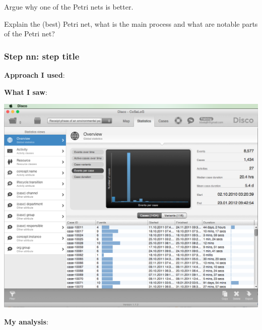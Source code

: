 \documentclass[]{article}
\begin{document}
Argue why one of the Petri nets is better.

Explain the (best) Petri net, what is the main process and what are
notable parts of the Petri net?

\subsubsection{Step nn: step title}\label{step-nn-step-title}

\textbf{Approach I used}:

\textbf{What I saw}:

\includegraphics{dummy.png}

\textbf{My analysis}:
\end{document}
